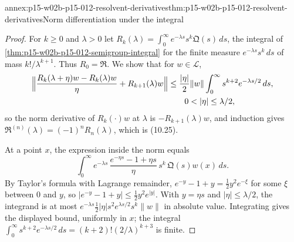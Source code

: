 \begin{annexitem}{annex:p15-w02b-p15-012-resolvent-derivatives}{thm:p15-w02b-p15-012-resolvent-derivatives}{Norm differentiation under the integral}
\begin{proof}
For \(k\geq0\) and \(\lambda>0\) let
\(R_k(\lambda)=\int_0^\infty e^{-\lambda s}s^k\mathfrak Q(s)\,ds\), the
integral of \cref{thm:p15-w02b-p15-012-semigroup-integral} for the finite
measure \(e^{-\lambda s}s^k\,ds\) of mass \(k!/\lambda^{k+1}\). Thus
\(R_0=\mathfrak R\). We show that for \(w\in\mathscr L\),
\[
 \begin{aligned}
 \Bigl\|\frac{R_k(\lambda+\eta)w-R_k(\lambda)w}{\eta}+R_{k+1}(\lambda)w\Bigr\|
   &\leq\frac{|\eta|}2\|w\|\int_0^\infty s^{k+2}e^{-\lambda s/2}\,ds,\\
   &\qquad0<|\eta|\leq\lambda/2,
 \end{aligned}
\]
so the norm derivative of \(R_k(\cdot)w\) at \(\lambda\) is
\(-R_{k+1}(\lambda)w\), and induction gives
\(\mathfrak R^{(n)}(\lambda)=(-1)^nR_n(\lambda)\), which is (10.25).

At a point \(x\), the expression inside the norm equals
\[
 \int_0^\infty e^{-\lambda s}\,\frac{e^{-\eta s}-1+\eta s}{\eta}\,s^k\,\mathfrak Q(s)w(x)\,ds .
\]
By Taylor's formula with Lagrange remainder,
\(e^{-y}-1+y=\frac12y^2e^{-\xi}\) for some \(\xi\) between \(0\) and \(y\), so
\(|e^{-y}-1+y|\leq\frac12y^2e^{|y|}\). With \(y=\eta s\) and
\(|\eta|\leq\lambda/2\), the integrand is at most
\(e^{-\lambda s}\frac12|\eta|s^2e^{\lambda s/2}s^k\|w\|\) in absolute value.
Integrating gives the displayed bound, uniformly in \(x\); the integral
\(\int_0^\infty s^{k+2}e^{-\lambda s/2}\,ds=(k+2)!(2/\lambda)^{k+3}\) is finite.
\end{proof}
\end{annexitem}

